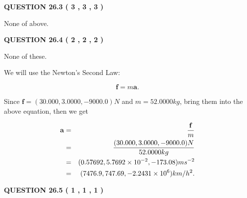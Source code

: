 \documentclass[12pt]{article}
\begin{document}
 
 
  
\vspace{0.2in}
  
{\textbf{\Large{QUESTION
26.3 
 (           3 ,           3 ,           3 )
}}}
  
  
 
 
\noindent{}
 
 
 None of above.
 
 
 
 
  
\vspace{0.2in}
  
{\textbf{\Large{QUESTION
26.4 
 (           2 ,           2 ,           2 )
}}}
  
  
 
 
\noindent{}
 
 
 None of these.
 
 
 
 
 
 
\noindent{}

We will use the Newton's Second Law:
 
\[
\mathbf{f}=m\mathbf{a}.
\]
 
Since $\mathbf{f}=( %
30.000,  %
3.0000,  %
-9000.0 )N$
and $m= %
52.0000kg$, bring them into the above equation, then we get
 
\begin{eqnarray*}
\mathbf{a}&=&\frac{\mathbf{f}}m  \\
&=&\frac{(
30.000 ,
3.0000 ,
-9000.0 )N
}{ %
52.0000 kg}  \\
&=&(
0.57692 ,
5.7692 \times 10^{-2},
-173.08
)ms^{-2} \\
&=&(
7476.9 ,
747.69 ,
-2.2431 \times 10^{6}
)km/h^2.
\end{eqnarray*}
 
 
 
  
\vspace{0.2in}
  
{\textbf{\Large{QUESTION
26.5 
 (           1 ,           1 ,           1 )
}}}
  
  


 
 
\noindent{}
 
\end{document}
